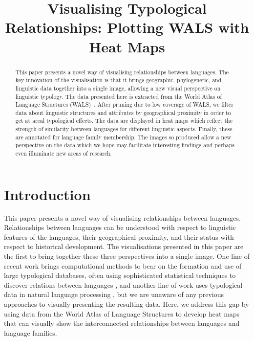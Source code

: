 \documentclass[11pt]{article}
\title{Visualising Typological Relationships: Plotting WALS with Heat Maps}
\date{}
\begin{document}
\maketitle

\begin{abstract}
This paper presents a novel way of visualising relationships between languages. The key innovation of the visualisation is that it brings geographic, phylogenetic, and linguistic data together into a single image, allowing a new visual perspective on linguistic typology. The data presented here is extracted from the World Atlas of Language Structures (WALS)~\cite{wals-2011}. After pruning due to low coverage of WALS, we filter data about linguistic structures and attributes by geographical proximity in order to get at areal typological effects. The data are displayed in heat maps which reflect the strength of similarity between languages for different linguistic aspects. Finally, these are annotated for language family membership. The images so produced allow a new perspective on the data which we hope may facilitate interesting findings and perhaps even illuminate new areas of research.
\end{abstract}

\section{Introduction}

This paper presents a novel way of visualising relationships between languages. Relationships between languages can be understood with respect to linguistic features of the languages, their geographical proximity, and their status with respect to historical development. The visualisations presented in this paper are the first to bring together these three perspectives into a single image. One line of recent work brings computational methods to bear on the formation and use of large typological databases, often using sophisticated statistical techniques to discover relations between languages \cite[among others]{cysouw2011,daume07implication,daume09areal}, and another line of work uses typological data in natural language processing \cite[for example]{georgi:etal:10,lewis:xia:08}, but we are unaware of any previous approaches to visually presenting the resulting data. Here, we address this gap by using data from the World Atlas of Language Structures \cite{wals-2011} to develop heat maps that can visually show the interconnected relationships between languages and language families. 
\end{document}
